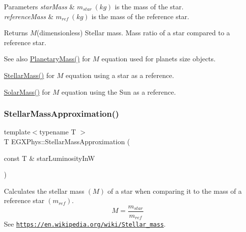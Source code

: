 \begin{DoxyParams}{Parameters}
{\em star\+Mass} & $m_{star}\ (kg)$ is the mass of the star. \\
\hline
{\em reference\+Mass} & $m_{ref}\ (kg)$ is the mass of the reference star. \\
\hline
\end{DoxyParams}
\begin{DoxyReturn}{Returns}
$M$(dimensionless) Stellar mass. Mass ratio of a star compared to a reference star. 
\end{DoxyReturn}
\begin{DoxySeeAlso}{See also}
\mbox{\hyperlink{group___e_g_x_phys-_planetary_mass_ga225bcf56fb37468f6d4d46493d403503}{Planetary\+Mass()}} for $M$ equation used for planets size objects. 

\mbox{\hyperlink{group___e_g_x_phys-_stellar_mass_gabbd6081cd3bfb0153d7470d58f733a61}{Stellar\+Mass()}} for $M$ equation using a star as a reference. 

\mbox{\hyperlink{group___e_g_x_phys-_stellar_mass_gac393d64d586be3dc76ac7a98ac336514}{Solar\+Mass()}} for $M$ equation using the Sun as a reference. 
\end{DoxySeeAlso}
\mbox{\label{group___e_g_x_phys-_stellar_mass_gad4da54e02d03fe56e7da736f7d12b42c}} 
\subsubsection{\texorpdfstring{Stellar\+Mass\+Approximation()}{StellarMassApproximation()}}
{\footnotesize\ttfamily template$<$typename T $>$ \\
T E\+G\+X\+Phys\+::\+Stellar\+Mass\+Approximation (\begin{DoxyParamCaption}\item[{const T \&}]{star\+Luminosity\+InW }\end{DoxyParamCaption})}



Calculates the stellar mass $(M)$ of a star when comparing it to the mass of a reference star $(m_{ref})$. \[M=\frac{m_{star}}{m_{ref}}\] See \href{https://en.wikipedia.org/wiki/Stellar_mass}{\tt https\+://en.\+wikipedia.\+org/wiki/\+Stellar\+\_\+mass}. 


